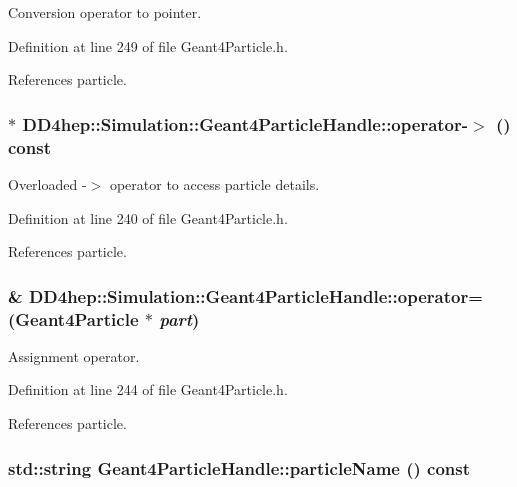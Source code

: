 Conversion operator to pointer. 

Definition at line 249 of file Geant4Particle.h.

References particle.\hypertarget{class_d_d4hep_1_1_simulation_1_1_geant4_particle_handle_adaa32e5e921e192a171b7ca1519a6b5e}{
\subsubsection[{operator-\/$>$}]{ $\ast$ DD4hep::Simulation::Geant4ParticleHandle::operator-\/$>$ () const}}
\label{class_d_d4hep_1_1_simulation_1_1_geant4_particle_handle_adaa32e5e921e192a171b7ca1519a6b5e}


Overloaded -\/$>$ operator to access particle details. 

Definition at line 240 of file Geant4Particle.h.

References particle.\hypertarget{class_d_d4hep_1_1_simulation_1_1_geant4_particle_handle_a127942c2338b44ef36f9f8eae2845b63}{
\subsubsection[{operator=}]{ \& DD4hep::Simulation::Geant4ParticleHandle::operator= ({\bf Geant4Particle} $\ast$ {\em part})}}
\label{class_d_d4hep_1_1_simulation_1_1_geant4_particle_handle_a127942c2338b44ef36f9f8eae2845b63}


Assignment operator. 

Definition at line 244 of file Geant4Particle.h.

References particle.\hypertarget{class_d_d4hep_1_1_simulation_1_1_geant4_particle_handle_a3fddc59cc15be7f8a1ff3177fe57ed2b}{
\subsubsection[{particleName}]{\setlength{\rightskip}{0pt plus 5cm}std::string Geant4ParticleHandle::particleName () const}}
\label{class_d_d4hep_1_1_simulation_1_1_geant4_particle_handle_a3fddc59cc15be7f8a1ff3177fe57ed2b}


